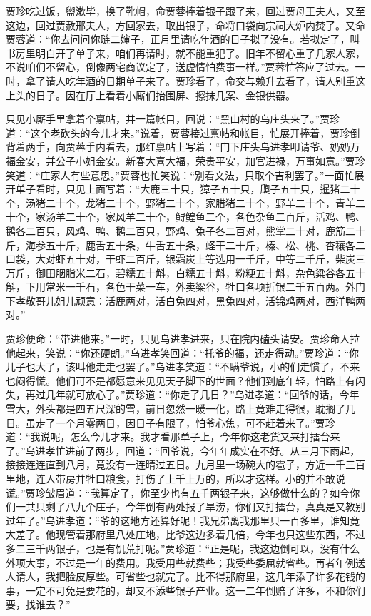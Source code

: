 \documentclass[12pt,oneside]{book}
\begin{document}
贾珍吃过饭，盥漱毕，换了靴帽，命贾蓉捧着银子跟了来，回过贾母王夫人，又至这边，回过贾赦邢夫人，方回家去，取出银子，命将口袋向宗祠大炉内焚了。又命贾蓉道：“你去问问你琏二婶子，正月里请吃年酒的日子拟了没有。若拟定了，叫书房里明白开了单子来，咱们再请时，就不能重犯了。旧年不留心重了几家人家，不说咱们不留心，倒像两宅商议定了，送虚情怕费事一样。”贾蓉忙答应了过去。一时，拿了请人吃年酒的日期单子来了。贾珍看了，命交与赖升去看了，请人别重这上头的日子。因在厅上看着小厮们抬围屏、擦抹几案、金银供器。

只见小厮手里拿着个禀帖，并一篇帐目，回说：“黑山村的乌庄头来了。”贾珍道：“这个老砍头的今儿才来。”说着，贾蓉接过禀帖和帐目，忙展开捧着，贾珍倒背着两手，向贾蓉手内看去，那红禀帖上写着：“门下庄头乌进孝叩请爷、奶奶万福金安，并公子小姐金安。新春大喜大福，荣贵平安，加官进禄，万事如意。”贾珍笑道：“庄家人有些意思。”贾蓉也忙笑说：“别看文法，只取个吉利罢了。”一面忙展开单子看时，只见上面写着：“大鹿三十只，獐子五十只，瓟子五十只，暹猪二十个，汤猪二十个，龙猪二十个，野猪二十个，家腊猪二十个，野羊二十个，青羊二十个，家汤羊二十个，家风羊二十个，鲟鳇鱼二个，各色杂鱼二百斤，活鸡、鸭、鹅各二百只，风鸡、鸭、鹅二百只，野鸡、兔子各二百对，熊掌二十对，鹿筋二十斤，海参五十斤，鹿舌五十条，牛舌五十条，蛏干二十斤，榛、松、桃、杏穰各二口袋，大对虾五十对，干虾二百斤，银霜炭上等选用一千斤，中等二千斤，柴炭三万斤，御田胭脂米二石，碧糯五十斛，白糯五十斛，粉粳五十斛，杂色粱谷各五十斛，下用常米一千石，各色干菜一车，外卖粱谷，牲口各项折银二千五百两。外门下孝敬哥儿姐儿顽意：活鹿两对，活白兔四对，黑兔四对，活锦鸡两对，西洋鸭两对。”

贾珍便命：“带进他来。”一时，只见乌进孝进来，只在院内磕头请安。贾珍命人拉他起来，笑说：“你还硬朗。”乌进孝笑回道：“托爷的福，还走得动。”贾珍道：“你儿子也大了，该叫他走走也罢了。”乌进孝笑道：“不瞒爷说，小的们走惯了，不来也闷得慌。他们可不是都愿意来见见天子脚下的世面？他们到底年轻，怕路上有闪失，再过几年就可放心了。”贾珍道：“你走了几日？”乌进孝道：“回爷的话，今年雪大，外头都是四五尺深的雪，前日忽然一暖一化，路上竟难走得很，耽搁了几日。虽走了一个月零两日，因日子有限了，怕爷心焦，可不赶着来了。”贾珍道：“我说呢，怎么今儿才来。我才看那单子上，今年你这老货又来打擂台来了。”乌进孝忙进前了两步，回道：“回爷说，今年年成实在不好。从三月下雨起，接接连连直到八月，竟没有一连晴过五日。九月里一场碗大的雹子，方近一千三百里地，连人带房并牲口粮食，打伤了上千上万的，所以才这样。小的并不敢说谎。”贾珍皱眉道：“我算定了，你至少也有五千两银子来，这够做什么的？如今你们一共只剩了八九个庄子，今年倒有两处报了旱涝，你们又打擂台，真真是又教别过年了。”乌进孝道：“爷的这地方还算好呢！我兄弟离我那里只一百多里，谁知竟大差了。他现管着那府里八处庄地，比爷这边多着几倍，今年也只这些东西，不过多二三千两银子，也是有饥荒打呢。”贾珍道：“正是呢，我这边倒可以，没有什么外项大事，不过是一年的费用。我受用些就费些；我受些委屈就省些。再者年例送人请人，我把脸皮厚些。可省些也就完了。比不得那府里，这几年添了许多花钱的事，一定不可免是要花的，却又不添些银子产业。这一二年倒赔了许多，不和你们要，找谁去？”
\end{document}
